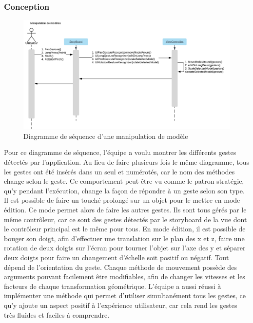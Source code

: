 \documentclass[rapport.tex]{subfiles}
\begin{document}
\subsubsection*{Conception}
\begin{figure}[H]
    \includegraphics[width=\textwidth]{DSS_ManipulationModels.png}
\centering
    \caption{Diagramme de séquence d'une manipulation de modèle}
\end{figure}
Pour ce diagramme de séquence, l’équipe a voulu montrer les différents gestes détectés par l’application. Au lieu de faire plusieurs fois le même diagramme, tous les gestes ont été insérés dans un seul et numérotés, car le nom des méthodes change selon le geste. Ce comportement peut être vu comme le patron stratégie, qu’y pendant l’exécution, change la façon de répondre à un geste selon son type. Il est possible de faire un touché prolongé sur un objet pour le mettre en mode édition. Ce mode permet alors de faire les autres gestes. Ils sont tous gérés par le même contrôleur, car ce sont des gestes détectés par le storyboard de la vue dont le contrôleur principal est le même pour tous. En mode édition, il est possible de bouger son doigt, afin d’effectuer une translation sur le plan des x et z, faire une rotation de deux doigts sur l’écran pour tourner l’objet sur l’axe des y et séparer deux doigts pour faire un changement d’échelle soit positif ou négatif. Tout dépend de l’orientation du geste. Chaque méthode de mouvement possède des arguments pouvant facilement être modifiables, afin de changer les vitesses et les facteurs de chaque transformation géométrique. L’équipe a aussi réussi à implémenter une méthode qui permet d’utiliser simultanément tous les gestes, ce qu’y ajoute un aspect positif à l’expérience utilisateur, car cela rend les gestes très fluides et faciles à comprendre.
\end{document}
